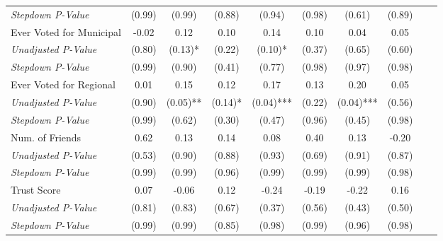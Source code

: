 \begin{tabular}{l c c c c c c c c c}
\quad \textit{Stepdown P-Value} & (0.99) & (0.99) & (0.88) & (0.94) & (0.98) & (0.61) & (0.89) \\
Ever Voted for Municipal & -0.02 & 0.12 & 0.10 & 0.14 & 0.10 & 0.04 & 0.05 \\
\quad \textit{Unadjusted P-Value} & (0.80) & (0.13)* & (0.22) & (0.10)* & (0.37) & (0.65) & (0.60) \\
\quad \textit{Stepdown P-Value} & (0.99) & (0.90) & (0.41) & (0.77) & (0.98) & (0.97) & (0.98) \\
Ever Voted for Regional & 0.01 & 0.15 & 0.12 & 0.17 & 0.13 & 0.20 & 0.05 \\
\quad \textit{Unadjusted P-Value} & (0.90) & (0.05)** & (0.14)* & (0.04)*** & (0.22) & (0.04)*** & (0.56) \\
\quad \textit{Stepdown P-Value} & (0.99) & (0.62) & (0.30) & (0.47) & (0.96) & (0.45) & (0.98) \\
Num. of Friends & 0.62 & 0.13 & 0.14 & 0.08 & 0.40 & 0.13 & -0.20 \\
\quad \textit{Unadjusted P-Value} & (0.53) & (0.90) & (0.88) & (0.93) & (0.69) & (0.91) & (0.87) \\
\quad \textit{Stepdown P-Value} & (0.99) & (0.99) & (0.96) & (0.99) & (0.99) & (0.99) & (0.98) \\
Trust Score & 0.07 & -0.06 & 0.12 & -0.24 & -0.19 & -0.22 & 0.16 \\
\quad \textit{Unadjusted P-Value} & (0.81) & (0.83) & (0.67) & (0.37) & (0.56) & (0.43) & (0.50) \\
\quad \textit{Stepdown P-Value} & (0.99) & (0.99) & (0.85) & (0.98) & (0.99) & (0.96) & (0.98) \\
\bottomrule
\end{tabular}
